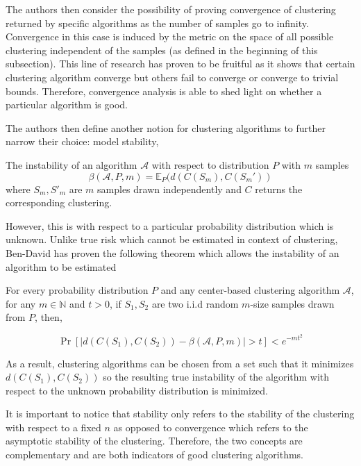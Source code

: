 The authors then consider the possibility of proving convergence of clustering returned by specific algorithms as the number of samples go to infinity. Convergence in this case is induced by the metric on the space of all possible clustering independent of the samples (as defined in the beginning of this subsection). This line of research has proven to be fruitful as it shows that certain clustering algorithm converge but others fail to converge or converge to trivial bounds. Therefore, convergence analysis is able to shed light on whether a particular algorithm is good.

The authors then define another notion for clustering algorithms to further narrow their choice: model stability,

\begin{definition}
    The instability of an algorithm $\mathcal{A}$ with respect to distribution $P$ with $m$ samples 
    \[ \beta(\mathcal{A}, P, m) =\mathbb{E}_P(d(C(S_m), C(S_m')) \]
    where $S_m, S'_m$ are $m$ samples drawn independently and $C$ returns the corresponding clustering.
\end{definition}

However, this is with respect to a particular probability distribution which is unknown. Unlike true risk which cannot be estimated in context of clustering, Ben-David has proven the following theorem which allows the instability of an algorithm to be estimated

\begin{theorem}
    For every probability distribution $P$ and any center-based clustering algorithm $\mathcal{A}$, for any $m \in \mathbb{N}$ and $t > 0$, if $S_1, S_2$ are two i.i.d random $m$-size samples drawn from $P$, then,
    
    \[ \Pr[|d(C(S_1), C(S_2)) - \beta(\mathcal{A}, P, m)| > t] < e^{-mt^2} \]
\end{theorem}

As a result, clustering algorithms can be chosen from a set such that it minimizes $d(C(S_1),C(S_2))$ so the resulting true instability of the algorithm with respect to the unknown probability distribution is minimized. 

It is important to notice that stability only refers to the stability of the clustering with respect to a fixed $n$ as opposed to convergence which refers to the asymptotic stability of the clustering. Therefore, the two concepts are complementary and are both indicators of good clustering algorithms.
